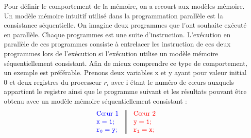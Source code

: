\documentclass[12pt,a4paper]{article}
\begin{document}
Pour définir le comportement de la mémoire, on a recourt aux modèles mémoire. Un modèle mémoire intuitif utilisé dans la programmation parallèle est la consistance séquentielle. On imagine deux programmes que l'ont souhaite exécuté en parallèle. Chaque programmes est une suite d'instruction. L'exécution en parallèle de ces programmes consiste à entrelacer les instruction de ces deux programmes lors de l'exécution si l'exécution utilise un modèle mémoire séquentiellement consistant. Afin de mieux comprendre ce type de comportement, un exemple est préférable. Prenons deux variables x et y ayant pour valeur initial 0 et deux registres du processeur $r_i$ avec i étant le numéro de cœurs auxquels appartient le registre ainsi que le programme suivant et les résultats pouvant être obtenu avec un modèle mémoire séquentiellement consistant :
\clearpage
\[
\begin{array}{c||c}
  \begin{array}{l}
    \textcolor[rgb]{0,0,1}{\text{C\oe{}ur 1}} \\
    \textcolor[rgb]{0,0,1}{\mathtt{x = 1;}} \\
    \textcolor[rgb]{0,0,1}{\mathtt{r_0 = y;}} \\
  \end{array} &
  \begin{array}{l}
    \textcolor[rgb]{1,0,0}{\text{C\oe{}ur 2}} \\
    \textcolor[rgb]{1,0,0}{\mathtt{y = 1;}} \\
    \textcolor[rgb]{1,0,0}{\mathtt{r_1 = x;}} \\
  \end{array}
\end{array}
\]
\end{document}

